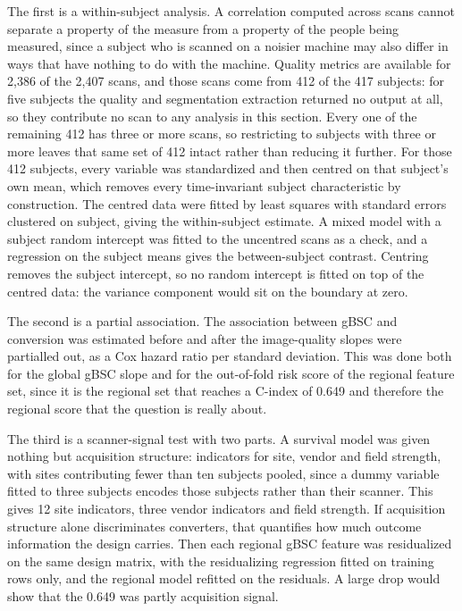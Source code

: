 \documentclass[blue]{ludusofficial}  %
\begin{document}
The first is a within-subject analysis. A correlation computed across scans cannot separate a property of the measure from a property of the people being measured, since a subject who is scanned on a noisier machine may also differ in ways that have nothing to do with the machine. Quality metrics are available for 2,386 of the 2,407 scans, and those scans come from 412 of the 417 subjects: for five subjects the quality and segmentation extraction returned no output at all, so they contribute no scan to any analysis in this section. Every one of the remaining 412 has three or more scans, so restricting to subjects with three or more leaves that same set of 412 intact rather than reducing it further. For those 412 subjects, every variable was standardized and then centred on that subject's own mean, which removes every time-invariant subject characteristic by construction. The centred data were fitted by least squares with standard errors clustered on subject, giving the within-subject estimate. A mixed model with a subject random intercept was fitted to the uncentred scans as a check, and a regression on the subject means gives the between-subject contrast. Centring removes the subject intercept, so no random intercept is fitted on top of the centred data: the variance component would sit on the boundary at zero.

The second is a partial association. The association between gBSC and conversion was estimated before and after the image-quality slopes were partialled out, as a Cox hazard ratio per standard deviation. This was done both for the global gBSC slope and for the out-of-fold risk score of the regional feature set, since it is the regional set that reaches a C-index of 0.649 and therefore the regional score that the question is really about.

The third is a scanner-signal test with two parts. A survival model was given nothing but acquisition structure: indicators for site, vendor and field strength, with sites contributing fewer than ten subjects pooled, since a dummy variable fitted to three subjects encodes those subjects rather than their scanner. This gives 12 site indicators, three vendor indicators and field strength. If acquisition structure alone discriminates converters, that quantifies how much outcome information the design carries. Then each regional gBSC feature was residualized on the same design matrix, with the residualizing regression fitted on training rows only, and the regional model refitted on the residuals. A large drop would show that the 0.649 was partly acquisition signal.
\end{document}
